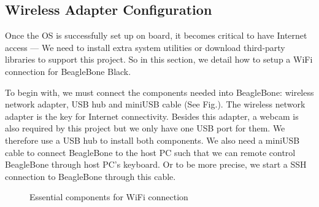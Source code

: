 \documentclass[12pt,journal,draftclsnofoot,onecolumn]{IEEEtran}
\begin{document}
\subsection{Wireless Adapter Configuration}\label{Wireless}
Once the OS is successfully set up on board, it becomes critical to have Internet access --- We need to install extra system utilities or download third-party libraries to support this project. So in this section, we detail how to setup a WiFi connection for BeagleBone Black.

To begin with, we must connect the components needed into BeagleBone: wireless network adapter, USB hub and miniUSB cable (See Fig.). The wireless network adapter is the key for Internet connectivity. Besides this adapter, a webcam is also required by this project but we only have one USB port for them.  We therefore use a USB hub to install both components. We also need a miniUSB cable to connect BeagleBone to the host PC such that we can remote control BeagleBone through host PC's keyboard. Or to be more precise, we start a SSH connection to BeagleBone through this cable.

\begin{figure}[htb]
	\centering
     \caption{Essential components for WiFi connection}
     \end{figure}
\end{document}
